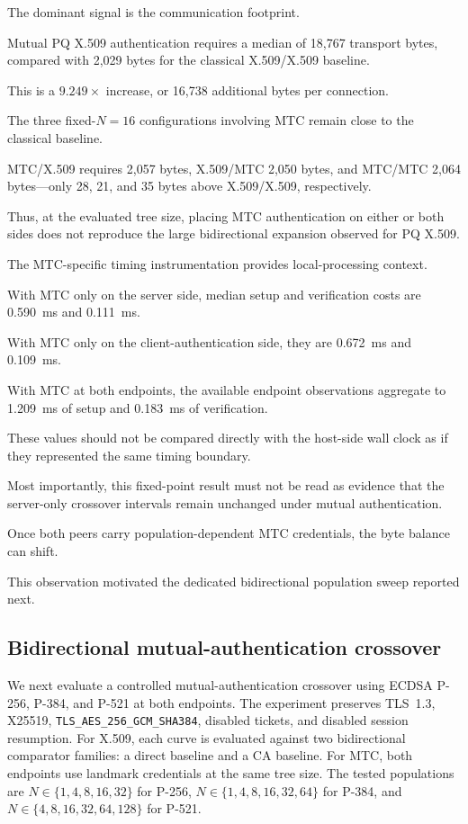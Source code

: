 \documentclass[journal]{IEEEtran}
\begin{document}
The dominant signal is the communication footprint.

Mutual PQ X.509 authentication requires a median of 18,767 transport bytes, compared with 2,029 bytes for the classical X.509/X.509 baseline.

This is a $9.249\times$ increase, or 16,738 additional bytes per connection.



The three fixed-$N=16$ configurations involving MTC remain close to the classical baseline.

MTC/X.509 requires 2,057 bytes, X.509/MTC 2,050 bytes, and MTC/MTC 2,064 bytes---only 28, 21, and 35 bytes above X.509/X.509, respectively.

Thus, at the evaluated tree size, placing MTC authentication on either or both sides does not reproduce the large bidirectional expansion observed for PQ X.509.



The MTC-specific timing instrumentation provides local-processing context.

With MTC only on the server side, median setup and verification costs are 0.590~ms and 0.111~ms.

With MTC only on the client-authentication side, they are 0.672~ms and 0.109~ms.

With MTC at both endpoints, the available endpoint observations aggregate to 1.209~ms of setup and 0.183~ms of verification.

These values should not be compared directly with the host-side wall clock as if they represented the same timing boundary.



Most importantly, this fixed-point result must not be read as evidence that the server-only crossover intervals remain unchanged under mutual authentication.

Once both peers carry population-dependent MTC credentials, the byte balance can shift.

This observation motivated the dedicated bidirectional population sweep reported next.



\subsection{Bidirectional mutual-authentication crossover}

\label{sec:mutual-auth-crossover}

We next evaluate a controlled mutual-authentication crossover using ECDSA P-256, P-384, and P-521 at both endpoints. The experiment preserves TLS~1.3, X25519, \texttt{TLS\_AES\_256\_GCM\_SHA384}, disabled tickets, and disabled session resumption. For X.509, each curve is evaluated against two bidirectional comparator families: a direct baseline and a CA baseline. For MTC, both endpoints use landmark credentials at the same tree size. The tested populations are $N\in\{1,4,8,16,32\}$ for P-256, $N\in\{1,4,8,16,32,64\}$ for P-384, and $N\in\{4,8,16,32,64,128\}$ for P-521.
\end{document}
